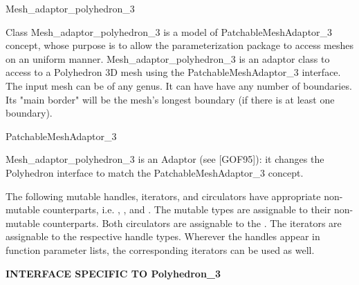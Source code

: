 

\begin{ccRefClass}{Mesh_adaptor_polyhedron_3}  %



\ccDefinition


Class Mesh\_adaptor\_polyhedron\_3 is a model of PatchableMeshAdaptor\_3 concept, whose purpose is to allow the parameterization package to access meshes on an uniform manner.
Mesh\_adaptor\_polyhedron\_3 is an adaptor class to access to a Polyhedron 3D mesh using the PatchableMeshAdaptor\_3 interface.
The input mesh can be of any genus. It can have have any number of boundaries. Its "main border" will be the mesh's longest boundary (if there is at least one boundary).




\ccIsModel

PatchableMeshAdaptor\_3



Mesh\_adaptor\_polyhedron\_3 is an Adaptor (see [GOF95]): it changes the Polyhedron interface to match the PatchableMeshAdaptor\_3 concept.


\ccTypes

The following mutable handles, iterators, and circulators have appropriate
non-mutable counterparts, i.e. ,
, and . The mutable types are
assignable to their non-mutable counterparts.  Both circulators are
assignable to the . The iterators are
assignable to the respective handle types. Wherever the handles appear
in function parameter lists, the corresponding iterators can be used as
well.

{\bf INTERFACE SPECIFIC TO Polyhedron\_3}


\end{ccRefClass}
